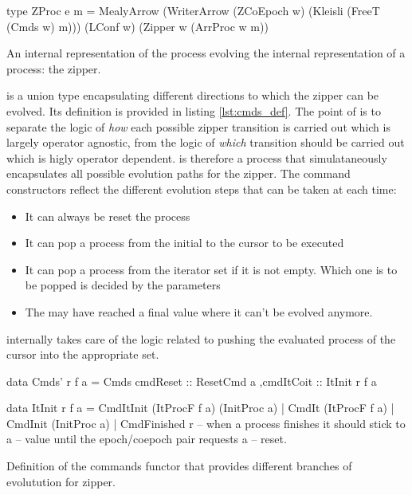 \begin{code}
\begin{haskellcode}
type ZProc e m =
  MealyArrow
    (WriterArrow (ZCoEpoch w) (Kleisli (FreeT (Cmds w) m)))
    (LConf w)
    (Zipper w (ArrProc w m))
\end{haskellcode}
  \caption{\label{lst:zproc_def}An internal representation of the
    process evolving the internal representation of a process: the
    zipper.}
\end{code}


 is a union type encapsulating different directions to which the
zipper can be evolved. Its definition is provided in listing
\ref{lst:cmds_def}. The point of  is to separate the logic of
\emph{how} each possible zipper transition is carried out which is largely
operator agnostic, from the logic of
\emph{which} transition should be carried out which is higly operator dependent.
 is therefore a process that simulataneously encapsulates all possible evolution paths
for the zipper.
The command constructors reflect the different evolution steps that can be taken at each time:

\begin{itemize}
\item It can always be reset the process
\item It can pop a process from the initial to the cursor to be executed
\item It can pop a process from the iterator set if it is not
  empty. Which one is to be popped is decided by the parameters
\item The may have reached a final value where it can't be evolved
  anymore.
\end{itemize}

 internally takes care of the logic related to pushing the
evaluated process of the cursor into the appropriate set.

\begin{code}
\begin{haskellcode}
data Cmds' r f a =
  Cmds { cmdReset :: ResetCmd a
        ,cmdItCoit :: ItInit r f a
       }

data ItInit r f a
  = CmdItInit (ItProcF f a) (InitProc a)
  | CmdIt (ItProcF f a)
  | CmdInit (InitProc a)
  | CmdFinished r -- when a process finishes it should stick to a
                  -- value until the epoch/coepoch pair requests a
                  -- reset.
\end{haskellcode}
  \caption{\label{lst:cmds_def}Definition of the commands functor that
    provides different branches of evolutution for zipper.}
\end{code}

